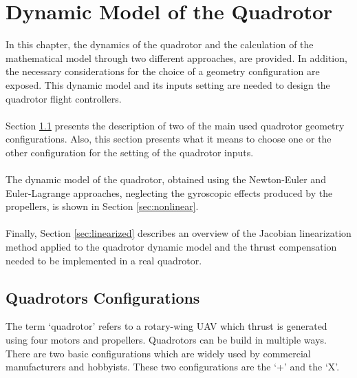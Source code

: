 \chapter{Dynamic Model of the Quadrotor \label{ch:model}}

In this chapter, the dynamics of the quadrotor and the calculation of the mathematical model through two different approaches, are provided. In addition, the necessary considerations for the choice of a geometry configuration are exposed. This dynamic model and its inputs setting are needed to design the quadrotor flight controllers.
\\\\
Section \ref{sec:configurations} presents the description of two of the main used quadrotor geometry configurations. Also, this section presents what it means to choose one or the other configuration for the setting of the quadrotor inputs.
\\\\
The dynamic model of the quadrotor, obtained using the Newton-Euler and Euler-Lagrange approaches, neglecting the gyroscopic effects produced by the propellers, is shown in Section \ref{sec:nonlinear}.
\\\\
Finally, Section \ref{sec:linearized} describes an overview of the Jacobian linearization method applied to the quadrotor dynamic model and the thrust compensation needed to be implemented in a real quadrotor.

\section{Quadrotors Configurations}
\label{sec:configurations}
The term `quadrotor' refers to a rotary-wing UAV which thrust is generated using four motors and propellers. Quadrotors can be build in multiple ways.
There are two basic configurations which are widely used by commercial manufacturers and hobbyists. These two configurations are the `+' and the `X'.


